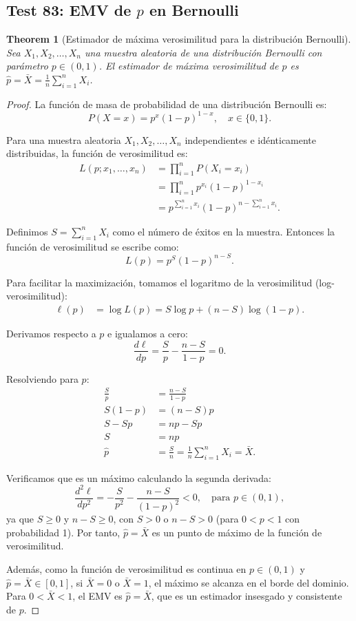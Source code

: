 \documentclass[11pt,a4paper]{article}
\theoremstyle{plain}
\newtheorem{theorem}{Theorem}[section]
\theoremstyle{definition}
\begin{document}
\subsection{Test 83: EMV de $p$ en Bernoulli}

\begin{theorem}[Estimador de máxima verosimilitud para la distribución Bernoulli]
Sea $X_1, X_2, \ldots, X_n$ una muestra aleatoria de una distribución Bernoulli con parámetro $p \in (0,1)$. El estimador de máxima verosimilitud de $p$ es $\hat{p} = \bar{X} = \frac{1}{n}\sum_{i=1}^{n} X_i$.
\end{theorem}

\begin{proof}
La función de masa de probabilidad de una distribución Bernoulli es:
\[
P(X = x) = p^x (1-p)^{1-x}, \quad x \in \{0, 1\}.
\]

Para una muestra aleatoria $X_1, X_2, \ldots, X_n$ independientes e idénticamente distribuidas, la función de verosimilitud es:
\begin{align*}
L(p; x_1, \ldots, x_n) &= \prod_{i=1}^{n} P(X_i = x_i) \\
&= \prod_{i=1}^{n} p^{x_i} (1-p)^{1-x_i} \\
&= p^{\sum_{i=1}^{n} x_i} (1-p)^{n - \sum_{i=1}^{n} x_i}.
\end{align*}

Definimos $S = \sum_{i=1}^{n} X_i$ como el número de éxitos en la muestra. Entonces la función de verosimilitud se escribe como:
\[
L(p) = p^S (1-p)^{n-S}.
\]

Para facilitar la maximización, tomamos el logaritmo de la verosimilitud (log-verosimilitud):
\begin{align*}
\ell(p) &= \log L(p) = S \log p + (n-S) \log(1-p).
\end{align*}

Derivamos respecto a $p$ e igualamos a cero:
\[
\frac{d\ell}{dp} = \frac{S}{p} - \frac{n-S}{1-p} = 0.
\]

Resolviendo para $p$:
\begin{align*}
\frac{S}{p} &= \frac{n-S}{1-p} \\
S(1-p) &= (n-S)p \\
S - Sp &= np - Sp \\
S &= np \\
\hat{p} &= \frac{S}{n} = \frac{1}{n}\sum_{i=1}^{n} X_i = \bar{X}.
\end{align*}

Verificamos que es un máximo calculando la segunda derivada:
\[
\frac{d^2\ell}{dp^2} = -\frac{S}{p^2} - \frac{n-S}{(1-p)^2} < 0, \quad \text{para } p \in (0,1),
\]
ya que $S \geq 0$ y $n-S \geq 0$, con $S > 0$ o $n-S > 0$ (para $0 < p < 1$ con probabilidad 1). Por tanto, $\hat{p} = \bar{X}$ es un punto de máximo de la función de verosimilitud.

Además, como la función de verosimilitud es continua en $p \in (0,1)$ y $\hat{p} = \bar{X} \in [0,1]$, si $\bar{X} = 0$ o $\bar{X} = 1$, el máximo se alcanza en el borde del dominio. Para $0 < \bar{X} < 1$, el EMV es $\hat{p} = \bar{X}$, que es un estimador insesgado y consistente de $p$.
\end{proof}
\end{document}
